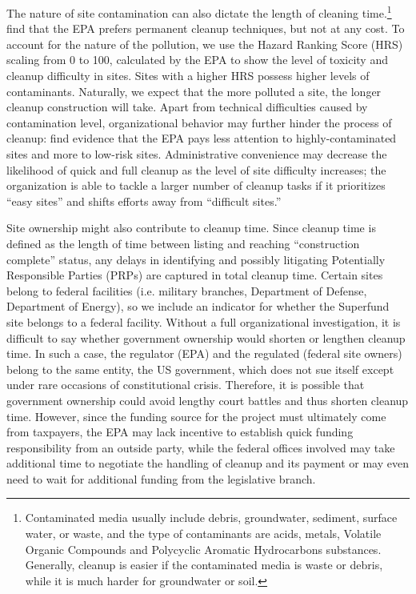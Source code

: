 \documentclass[12pt]{article}
\begin{document}
The nature of site contamination can also dictate the length of cleaning time.\footnote{Contaminated media usually include debris, groundwater, sediment, surface water, or waste, and the type of contaminants are acids, metals, Volatile Organic Compounds and Polycyclic Aromatic Hydrocarbons substances. Generally, cleanup is easier if the contaminated media is waste or debris, while it is much harder for groundwater or soil.} \textcite{Gupta1996} find that the EPA prefers permanent cleanup techniques, but not at any cost. To account for the nature of the pollution, we use the Hazard Ranking Score (HRS) scaling from 0 to 100, calculated by the EPA to show the level of toxicity and cleanup difficulty in sites. Sites with a higher HRS possess higher levels of contaminants. Naturally, we expect that the more polluted a site, the longer cleanup construction will take. Apart from technical difficulties caused by contamination level, organizational behavior may further hinder the process of cleanup: \textcite{daley2004policy} find evidence that the EPA pays less attention to highly-contaminated sites and more to low-risk sites. Administrative convenience may decrease the likelihood of quick and full cleanup as the level of site difficulty increases; the organization is able to tackle a larger number of cleanup tasks if it prioritizes ``easy sites'' and shifts efforts away from ``difficult sites.'' 

Site ownership might also contribute to cleanup time. Since cleanup time is defined as the length of time between listing and reaching ``construction complete'' status, any delays in identifying and possibly litigating Potentially Responsible Parties (PRPs) are captured in total cleanup time. Certain sites belong to federal facilities (i.e. military branches, Department of Defense, Department of Energy), so we include an indicator for whether the Superfund site belongs to a federal facility. Without a full organizational investigation, it is difficult to say whether government ownership would shorten or lengthen cleanup time. In such a case, the regulator (EPA) and the regulated (federal site owners) belong to the same entity, the US government, which does not sue itself except under rare occasions of constitutional crisis. Therefore, it is possible that government ownership could avoid lengthy court battles and thus shorten cleanup time. However, since the funding source for the project must ultimately come from taxpayers, the EPA may lack incentive to establish quick funding responsibility from an outside party, while the federal offices involved may take additional time to negotiate the handling of cleanup and its payment or may even need to wait for additional funding from the legislative branch. 
\end{document}
